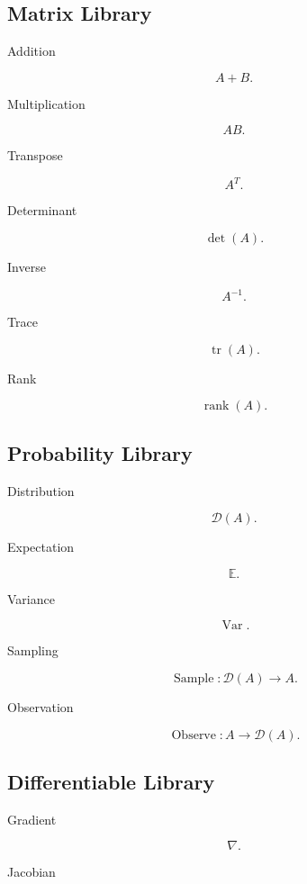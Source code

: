 \documentclass[12pt,oneside]{article}
\theoremstyle{definition}
\theoremstyle{remark}
\begin{document}
\subsection*{Matrix Library}

Addition

\[
A+B.
\]

Multiplication

\[
AB.
\]

Transpose

\[
A^T.
\]

Determinant

\[
\det(A).
\]

Inverse

\[
A^{-1}.
\]

Trace

\[
\operatorname{tr}(A).
\]

Rank

\[
\operatorname{rank}(A).
\]

\subsection*{Probability Library}

Distribution

\[
\mathcal D(A).
\]

Expectation

\[
\mathbb E.
\]

Variance

\[
\operatorname{Var}.
\]

Sampling

\[
\operatorname{Sample}
:
\mathcal D(A)
\rightarrow
A.
\]

Observation

\[
\operatorname{Observe}
:
A
\rightarrow
\mathcal D(A).
\]

\subsection*{Differentiable Library}

Gradient

\[
\nabla.
\]

Jacobian
\end{document}
